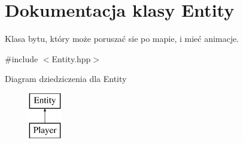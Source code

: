 \hypertarget{class_entity}{\section{Dokumentacja klasy Entity}
\label{class_entity}
}


Klasa bytu, który może poruszać sie po mapie, i mieć animacje.  




{\ttfamily \#include $<$Entity.\-hpp$>$}

Diagram dziedziczenia dla Entity\begin{figure}[H]
\begin{center}
\leavevmode
\includegraphics[height=2.000000cm]{class_entity}
\end{center}
\end{figure}
